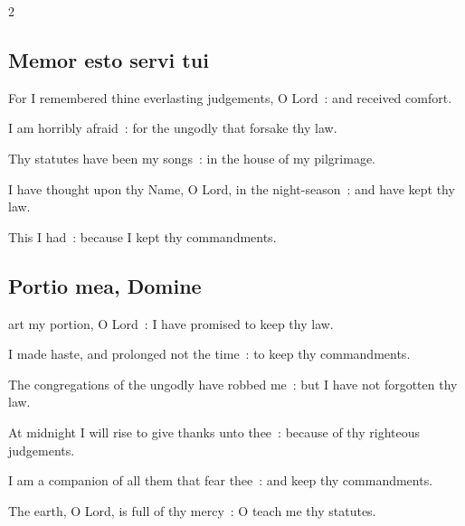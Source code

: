 \begin{multicols}{2}
\subsection{Memor esto servi tui}

\par
{}
For I remembered thine everlasting judgements, O Lord~: and received comfort.\par
{}I am horribly afraid~: for the ungodly that forsake thy law.\par
{}Thy statutes have been my songs~: in the house of my pilgrimage.\par
{}I have thought upon thy Name, O Lord, in the night-season~: and have kept thy law.\par
{}This I had~: because I kept thy commandments.\par


\subsection{Portio mea, Domine}


 art my portion, O Lord~: I have promised to keep thy law.\par
{}
I made haste, and prolonged not the time~: to keep thy commandments.\par
{}The congregations of the ungodly have robbed me~: but I have not forgotten thy law.\par
{}At midnight I will rise to give thanks unto thee~: because of thy righteous judgements.\par
{}I am a companion of all them that fear thee~: and keep thy commandments.\par
{}The earth, O Lord, is full of thy mercy~: O teach me thy statutes.\par


\end{multicols}
